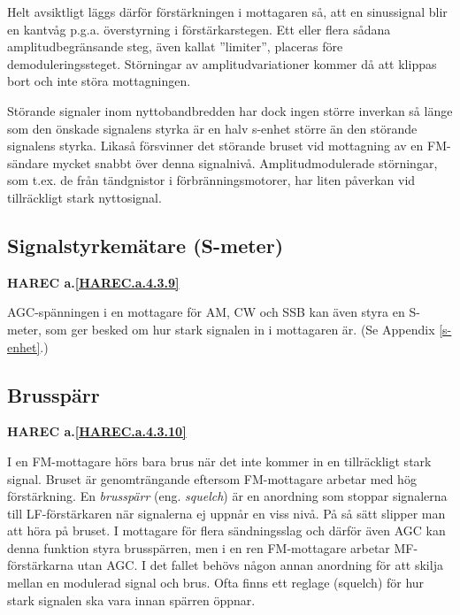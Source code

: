 Helt avsiktligt läggs därför förstärkningen i mottagaren så, att en
sinussignal blir en kantvåg p.g.a. överstyrning i
förstärkarstegen. Ett eller flera sådana amplitudbegränsande steg,
även kallat ''limiter'', placeras före demoduleringssteget. Störningar
av amplitudvariationer kommer då att klippas bort och inte störa
mottagningen.

Störande signaler inom nyttobandbredden har dock ingen större inverkan
så länge som den önskade signalens styrka är en halv s-enhet större än
den störande signalens styrka. Likaså försvinner det störande bruset
vid mottagning av en FM-sändare mycket snabbt över denna signalnivå.
Amplitudmodulerade störningar, som t.ex. de från tändgnistor i
förbränningsmotorer, har liten påverkan vid tillräckligt stark
nyttosignal.

\subsection{Signalstyrkemätare (S-meter)}
\textbf{HAREC a.\ref{HAREC.a.4.3.9}\label{myHAREC.a.4.3.9}}

AGC-spänningen i en mottagare för AM, CW och SSB kan även styra en
S-meter, som ger besked om hur stark signalen in i mottagaren är. (Se
Appendix \ref{s-enhet}.)

\subsection{Brusspärr}
\textbf{HAREC a.\ref{HAREC.a.4.3.10}\label{myHAREC.a.4.3.10}}

I en FM-mottagare hörs bara brus när det inte kommer in en
tillräckligt stark signal.  Bruset är genomträngande eftersom
FM-mottagare arbetar med hög förstärkning. En \emph{brusspärr}
(eng. \emph{squelch})
är en anordning som stoppar signalerna till LF-förstärkaren när
signalerna ej uppnår en viss nivå. På så sätt slipper man att höra på
bruset. I mottagare för flera sändningsslag och därför även AGC kan
denna funktion styra brusspärren, men i en ren FM-mottagare arbetar
MF-förstärkarna utan AGC. I det fallet behövs någon annan anordning för
att skilja mellan en modulerad signal och brus. Ofta finns ett reglage
(squelch) för hur stark signalen ska vara innan spärren öppnar.
